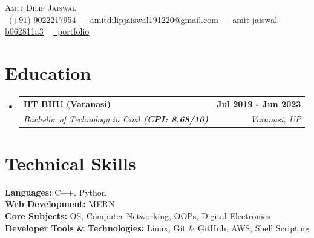\documentclass[letterpaper,11pt]{article}
\makeatletter
\newcommand{\resumeSubheading}[4]{
  \vspace{-2pt}\item
    \begin{tabular*}{1.0\textwidth}[t]{l@{\extracolsep{\fill}}r}
      \textbf{#1} & \textbf{\small #2} \\
      \textit{\small#3} & \textit{\small #4} \\
    \end{tabular*}\vspace{-7pt}
}
\newcommand{\resumeSubHeadingListStart}{\begin{itemize}[leftmargin=0.0in, label={}]}
\newcommand{\resumeSubHeadingListEnd}{\end{itemize}}
\makeatother
\begin{document}
\begin{center}
    {\Huge \scshape \href{https://amit-dilip-jaiswal.vercel.app/}{Amit Dilip Jaiswal}} \\ \vspace{3pt}
    \small \raisebox{-0.1\height}\faPhone\ {{(+91) 9022217954}} ~ \href{mailto:amitdilipjaiswal191220@gmail.com}{\raisebox{-0.2\height}\faEnvelope\  \underline{{amitdilipjaiswal191220@gmail.com}}} ~ 
    \href{https://www.linkedin.com/in/amit-jaiswal-b062811a3/}{\raisebox{-0.2\height}\faLinkedin\ \underline{{amit-jaiswal-b062811a3}}}  ~
    \href{https://amit-dilip-jaiswal.vercel.app/}{\raisebox{-0.2\height}\faLink\ \underline{{portfolio}}}
    \vspace{-10pt}
\end{center}





\section{Education}
\vspace{-2pt}
  \resumeSubHeadingListStart
    \resumeSubheading
      {IIT BHU (Varanasi)}{Jul 2019 - Jun 2023}
      {Bachelor of Technology in Civil \textbf{(CPI: 8.68/10)}}{Varanasi, UP}
      
  \resumeSubHeadingListEnd

 \vspace{-17pt}


\section{Technical Skills}
\vspace{-3pt}
 \begin{itemize}[leftmargin=0.15in, label={}]
    \small{\item{
    \textbf{Languages: }{C++, Python} \\
    \textbf{Web Development: }{MERN}\\
     \textbf{Core Subjects: }{OS, Computer Networking, OOPs, Digital Electronics} \\
     \textbf{Developer Tools \& Technologies: }{Linux, Git \& GitHub, AWS, Shell Scripting} \\
    
     
    }}
    
 \end{itemize}
 \vspace{-20pt}
\end{document}
